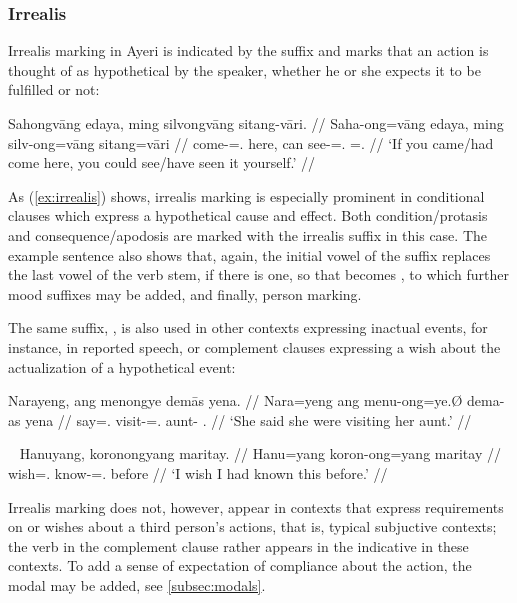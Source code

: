 \subsubsection{Irrealis}

Irrealis marking in Ayeri is indicated by the suffix  and 
marks that an action is thought of as hypothetical by the speaker, whether he 
or she expects it to be fulfilled or not:

\ex\label{ex:irrealis}\begingl
	\gla Sahongvāng edaya, ming silvongvāng sitang-vāri. //
	\glb Saha-ong=vāng edaya, ming silv-ong=vāng sitang=vāri //
	\glb come-\Irr{}=\Ssg{}.\Aarg{} here, can see-\Irr{}=\Ssg{}.\Aarg{} 
		\Refl{}=\Ssg{}.\Ins{} //
	\glft `If you came/had come here, you could see/have seen it  
		yourself.' //
\endgl\xe

As (\ref{ex:irrealis}) shows, irrealis marking is especially prominent in
conditional clauses which express a hypothetical cause and effect. Both
condition/protasis and consequence/apodosis are marked with the irrealis suffix
in this case. The example sentence also shows that, again, the initial vowel of
the suffix replaces the last vowel of the verb stem, if there is one, so that
 becomes , to which further mood
suffixes may be added, and finally, person marking.

The same suffix, , is also used in other contexts expressing 
inactual events, for instance, in reported speech, or complement clauses 
expressing a wish about the actualization of a hypothetical event:

\ex\begingl
	\gla Narayeng, ang menongye demās yena. //
	\glb Nara=yeng ang menu-ong=ye.Ø dema-as yena //
	\glc say=\TsgF{}.\Aarg{} \AgtT{} visit-\Irr{}=\TsgF{}.\Top{} 
		aunt-\Parg{} \TsgF{}.\Gen{} //
	\glft `She said she were visiting her aunt.' //
\endgl\xe

\ex~\begingl
	\gla Hanuyang, koronongyang maritay. //
	\glb Hanu=yang koron-ong=yang maritay //
	\glc wish=\Fsg{}.\Aarg{} know-\Irr{}=\Fsg{}.\Aarg{} before //
	\glft `I wish I had known this before.' //
\endgl\xe

Irrealis marking does not, however, appear in contexts that express
requirements on or wishes about a third person's actions, that is, typical
subjuctive contexts; the verb in the complement clause rather appears in the
indicative in these contexts. To add a sense of expectation of compliance about
the action, the modal  may be added, see
\autoref{subsec:modals}.

